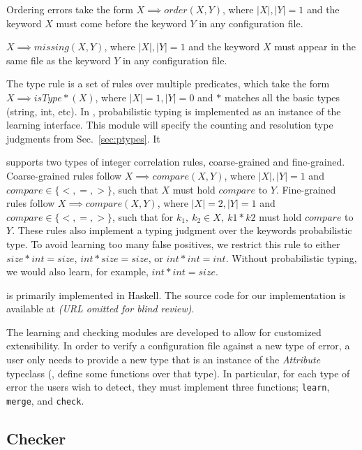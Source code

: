 Ordering errors take the form $X \implies order(X,Y)$, where $|X|,|Y|=1$ and the keyword $X$ must come before the keyword $Y$ in any configuration file.

$X \implies missing(X,Y)$, where $|X|,|Y|=1$ and the keyword $X$ must appear in the same file as the keyword $Y$ in any configuration file.

The type rule is a set of rules over multiple predicates, which take the form $X \implies isType\ast(X)$, where $|X|=1, |Y|=0$ and $\ast$ matches all the basic types (string, int, etc).
In \app, probabilistic typing is implemented as an instance of the learning interface.
This module will specify the counting and resolution type judgments from Sec.~\ref{sec:ptypes}.
It 

\app supports two types of integer correlation rules, coarse-grained and fine-grained.
Coarse-grained rules follow $X \implies compare(X,Y)$, where $|X|,|Y|=1$ and $compare \in \{<,=,>\}$, such that $X$ must hold $compare$ to $Y$.
Fine-grained rules follow $X \implies compare(X,Y)$, where $|X|=2,|Y|=1$ and $compare \in \{<,=,>\}$, such that for $k_1,\ k_2 \in X,\ k1*k2$ must hold $compare$ to $Y$.
These rules also implement a typing judgment over the keywords probabilistic type.
To avoid learning too many false positives, we restrict this rule to either $size*int=size$, $int*size=size$, or $int*int = int$.
Without probabilistic typing, we would also learn, for example, $int*int=size$.


\app is primarily implemented in Haskell.
The source code for our implementation is available at {\em (URL omitted for blind review)}.
 
The learning and checking modules are developed to allow
for customized extensibility. In order to verify a configuration file
against a new type of error, a user only needs to provide a new type
that is an instance of the \textit{Attribute} typeclass (\ie, define some
functions over that type). 
In particular, for each type of error the users
wish to detect, they must implement three functions;
\lstinline{learn}, \lstinline{merge}, and \lstinline{check}.


\subsection{Checker}
\label{sec-checker}

